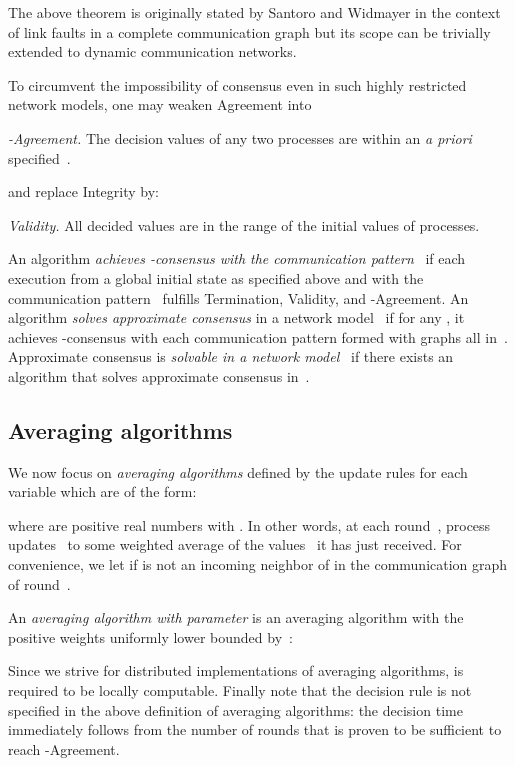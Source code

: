 \documentclass[a4paper]{article}
\theoremstyle{newthm}
\begin{document}
The above theorem is  originally stated by Santoro and Widmayer  in the context of link faults
	in a complete communication graph but its scope can be trivially extended to dynamic 
	communication networks.
 

To circumvent the impossibility of consensus even in such
     highly restricted network models, one may  weaken Agreement into 
 \begin{description}
\item{\em -Agreement.} The decision values of any two processes
  are within an {\it a priori} specified~.
\end{description}
and replace  Integrity by:       
\begin{description}
\item{\em Validity.}  All decided values are in the range of the initial values of
     processes.
\end{description}

An algorithm {\em  achieves -consensus with the communication pattern}~ 
	 if each execution from a global initial state as specified above and
             with the communication pattern~   fulfills Termination, 
             Validity, and -Agreement. 
 An algorithm {\em  solves approximate consensus\/} in a network
	     model~ if for any , it achieves -consensus with each communication
	     pattern formed with graphs all in~.
Approximate consensus is {\em solvable in a network model~\/} if 
	there exists an algorithm that solves   approximate consensus in~.

\subsection{Averaging algorithms}

We now focus on  {\em averaging algorithms} defined by the update rules 
	for each variable  which are of the form:
	
where  are  positive real numbers with  .
 In other words,  at each round~, process~ updates~ to some weighted average
	of the values~ it has just received.
For convenience, we let  if  is not an incoming neighbor of  in the
	communication graph of round~.

An {\em averaging algorithm with parameter}  is an averaging algorithm with
	the positive weights uniformly lower bounded by~: 
	
Since we strive for distributed implementations of averaging
     algorithms,  is required to be locally computable.
Finally note that the decision rule is not specified in the above definition of averaging algorithms:
	the decision time immediately follows from the number of rounds that is proven 
	to be sufficient to reach -Agreement.
\end{document}
